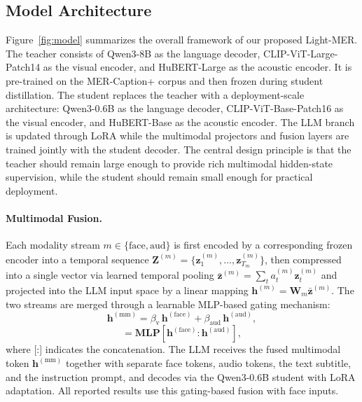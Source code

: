 \documentclass[sigconf]{acmart}
\begin{document}
\subsection{Model Architecture}

Figure~\ref{fig:model} summarizes the overall framework of our proposed Light-MER.
The teacher consists of Qwen3-8B \cite{yang2025} as the language decoder,
CLIP-ViT-Large-Patch14 \cite{radford2021} as the visual encoder, and
HuBERT-Large \cite{hsu2021hubert} as the acoustic encoder.
It is pre-trained on the MER-Caption+ \cite{affectgpt} corpus and then frozen
during student distillation.
The student replaces the teacher with a deployment-scale architecture:
Qwen3-0.6B \cite{yang2025} as the language decoder,
CLIP-ViT-Base-Patch16 \cite{radford2021} as the visual encoder, and
HuBERT-Base \cite{hsu2021hubert} as the acoustic encoder.
The LLM branch is updated through LoRA while the multimodal projectors
and fusion layers are trained jointly with the student decoder.
The central design principle is that the teacher should remain large
enough to provide rich multimodal hidden-state supervision, while the
student should remain small enough for practical deployment.

\paragraph{Multimodal Fusion.}
Each modality stream $m\!\in\!\{\mathrm{face},\mathrm{aud}\}$ is first
encoded by a corresponding frozen encoder into a temporal sequence
$\mathbf{Z}^{(m)}\!=\!\{\mathbf{z}_1^{(m)},\ldots,\mathbf{z}_{T_m}^{(m)}\}$,
then compressed into a single vector via learned temporal pooling
$\bar{\mathbf{z}}^{(m)}\!=\!\sum_t a_t^{(m)}\mathbf{z}_t^{(m)}$
and projected into the LLM input space by a linear mapping
$\mathbf{h}^{(m)}\!=\!\mathbf{W}_m\bar{\mathbf{z}}^{(m)}$.
The two streams are merged through a learnable MLP-based gating mechanism:
\begin{equation}
\mathbf{h}^{(\mathrm{mm})}
=
\beta_{\mathrm{v}}\,\mathbf{h}^{(\mathrm{face})}
+
\beta_{\mathrm{aud}}\,\mathbf{h}^{(\mathrm{aud})}, 
\end{equation}
\begin{equation}
[\beta_{\mathrm{face}},\beta_{\mathrm{aud}}]
\!=\textbf{MLP}[\mathbf{h}^{(\mathrm{face})}: \mathbf{h}^{(\mathrm{aud})}],
\end{equation}
where [:] indicates the concatenation.
The LLM receives the fused multimodal token $\mathbf{h}^{(\mathrm{mm})}$
together with separate face tokens, audio tokens, the text subtitle,
and the instruction prompt, and decodes via the Qwen3-0.6B student
with LoRA adaptation.
All reported results use this gating-based fusion with face inputs.
\end{document}
